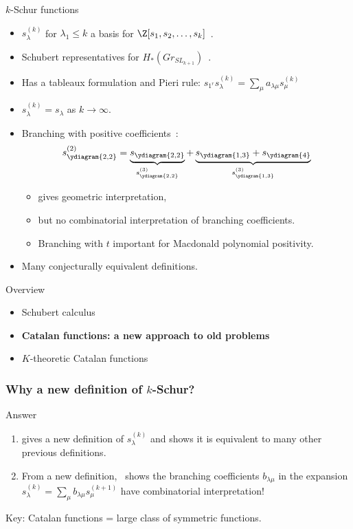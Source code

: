 \documentclass{beamer}
\begin{document}
\begin{frame}{\(k\)-Schur functions}
  \begin{itemize}
  \item \(s_\lambda^{(k)}\) for \(\lambda_1 \leq k\) a basis for
    \(\Z[s_1, s_2, \ldots, s_k]\)~\cite{lapointe-lascoux-morse}. \pause
  \item Schubert representatives for \(H_*(Gr_{SL_{k+1}})\)~\cite{Lam08}. \pause
  \item Has a tableaux formulation and Pieri rule: \(s_{1^r}
    s_\lambda^{(k)} = \sum_{\mu} a_{\lambda \mu} s_\mu^{(k)}\) \pause
  \item \(s_\lambda^{(k)} = s_\lambda\) as \(k \to \infty\).\pause
  \item Branching with positive coefficients~\cite{llms}:
      \[s_{\ydiagram{2,2}}^{(2)} =
        \underbrace{s_{\ydiagram{2,2}}}_{s^{(3)}_{\ydiagram{2,2}}}+\underbrace{s_{\ydiagram{1,3}}+s_{\ydiagram{4}}}_{s_{\ydiagram{1,3}}^{(3)}}\] \pause
      \begin{itemize}
      \item \cite{llms} gives geometric interpretation,\pause     
      \item but no combinatorial interpretation of branching coefficients.\pause
      \item Branching with \(t\) important for Macdonald polynomial positivity.\pause
      \end{itemize}
   \item Many conjecturally equivalent definitions. 
  \end{itemize}
\end{frame}
\begin{frame}{Overview}
  \begin{itemize}
  \item Schubert calculus
  \item \textbf{Catalan functions: a new approach to old problems}
  \item \(K\)-theoretic Catalan functions
  \end{itemize}
\end{frame}
\begin{frame}
  \frametitle{Why a new definition of \(k\)-Schur?}
  \pause
  \begin{block}{Answer}
    \begin{enumerate}
    \item \cite{catalans} gives a new definition of
      \(s_\lambda^{(k)}\) and shows it is
      equivalent to many other previous definitions. \pause
    \item From a new definition,~\cite{catalans} shows the branching
      coefficients \(b_{\lambda \mu}\) in the expansion
      \(s_\lambda^{(k)} = \sum_\mu b_{\lambda \mu} s_\mu^{(k+1)}\) have
      combinatorial interpretation!
    \end{enumerate}
    Key: \pause Catalan functions = large class of symmetric functions.
  \end{block}
\end{frame}
\end{document}
